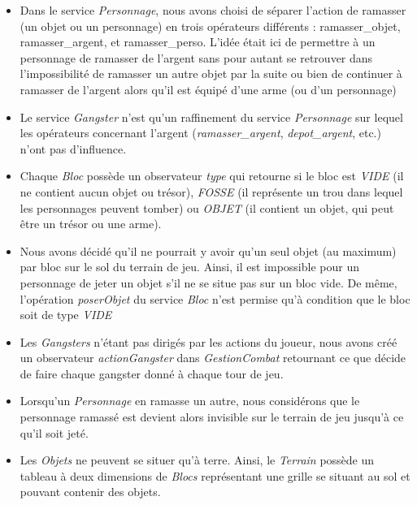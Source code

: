 \documentclass[a4paper, 11pt, notitlepage]{article}
\begin{document}
\begin{itemize}

\item Dans le service \emph{Personnage}, nous avons choisi de séparer l'action de ramasser (un objet ou un personnage) en trois opérateurs différents : ramasser\_objet, ramasser\_argent, et ramasser\_perso. L'idée était ici de permettre à un personnage de ramasser de l'argent sans pour autant se retrouver dans l'impossibilité de ramasser un autre objet par la suite ou bien de continuer à ramasser de l'argent alors qu'il est équipé d'une arme (ou d'un personnage) \\

\item Le service \emph{Gangster} n'est qu'un raffinement du service \emph{Personnage} sur lequel les opérateurs concernant l'argent (\emph{ramasser\_argent}, \emph{depot\_argent}, etc.) n'ont pas d'influence.  \\

\item Chaque \emph{Bloc} possède un observateur \emph{type} qui retourne si le bloc est \emph{VIDE} (il ne contient aucun objet ou trésor), \emph{FOSSE} (il représente un trou dans lequel les personnages peuvent tomber) ou \emph{OBJET} (il contient un objet, qui peut être un trésor ou une arme).  \\

\item Nous avons décidé qu'il ne pourrait y avoir qu'un seul objet (au maximum) par bloc sur le sol du terrain de jeu. Ainsi, il est impossible pour un personnage de jeter un objet s'il ne se situe pas sur un bloc vide. De même, l'opération \emph{poserObjet} du service \emph{Bloc} n'est permise qu'à condition que le bloc soit de type \emph{VIDE} \\

\item Les \emph{Gangsters} n'étant pas dirigés par les actions du joueur, nous avons créé un observateur \emph{actionGangster} dans \emph{GestionCombat} retournant ce que décide de faire chaque gangster donné à chaque tour de jeu.  \\

\item Lorsqu'un \emph{Personnage} en ramasse un autre, nous considérons que le personnage ramassé est devient alors invisible sur le terrain de jeu jusqu'à ce qu'il soit jeté. \\ 

\item Les \emph{Objets} ne peuvent se situer qu'à terre. Ainsi, le \emph{Terrain} possède un tableau à deux dimensions de \emph{Blocs} représentant une grille se situant au sol et pouvant contenir des objets. \\


\end{itemize}
\end{document}
